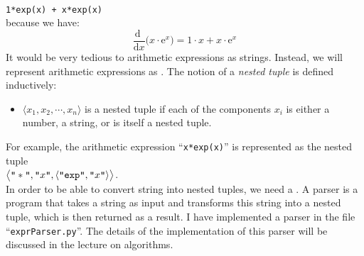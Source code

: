 \\[0.2cm]
\hspace*{1.3cm}
\texttt{1*exp(x) + x*exp(x)}
\\[0.2cm]
because we have:
$$ \frac{\mathrm{d}\;}{\mathrm{d}x} \bigl( x \cdot \mathrm{e}^x \bigr) = 1 \cdot x + x \cdot \mathrm{e}^x $$
It would be very tedious to  arithmetic expressions as strings.  Instead, we will represent
arithmetic expressions as .  The notion of a \emph{nested tuple} is defined inductively:
\begin{itemize}
\item $\langle x_1, x_2, \cdots, x_n \rangle$ is a nested tuple if each of the components $x_i$ is either a
      number, a string, or is itself a nested tuple.
\end{itemize}
For example, the arithmetic expression ``\texttt{x*exp(x)}'' is represented as the nested tuple
\\[0.2cm]
\hspace*{1.3cm}
$\bigl\langle\texttt{\symbol{34}}*\texttt{\symbol{34}}, \texttt{\symbol{34}}x\texttt{\symbol{34}}, \langle \texttt{\symbol{34}}\mathtt{exp}\texttt{\symbol{34}}, \texttt{\symbol{34}}x\texttt{\symbol{34}} \rangle\bigr\rangle$.
\\[0.2cm]
In order to be able to convert string into nested tuples, we need a .  A parser is a program that
takes a string as input and transforms this string into a nested tuple, which is then returned as a result.
I have implemented a parser in the file ``\texttt{exprParser.py}''.  The details of the implementation of this
parser will be discussed in the lecture on algorithms.

